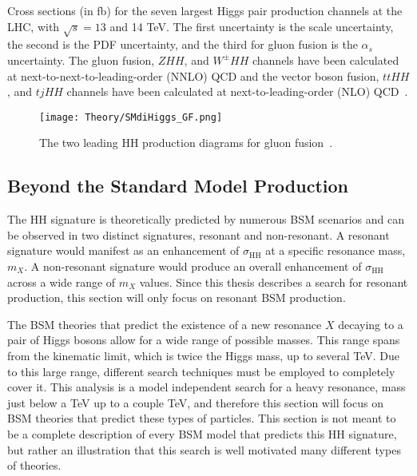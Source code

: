 \begin{table}[h!]
\begin{center}
    \caption{\label{tab:one} Cross sections (in fb) for the seven largest Higgs pair production channels at the LHC, with $\sqrt{s} = 13$ and 14 TeV. The first uncertainty is the scale uncertainty, the second is the PDF uncertainty, and the third for gluon fusion is the $\alpha_{s}$ uncertainty. The gluon fusion, $ZHH$, and $W^{\pm}HH$ channels have been calculated at next-to-next-to-leading-order (NNLO) QCD and the vector boson fusion, $ttHH$, and $tjHH$ channels have been calculated at next-to-leading-order (NLO) QCD~\cite{DiHiggsXsec}.}
\label{tab:DiHiggsXsec}
\end{center} 
\end{table}

\begin{figure}[h!]
\begin{center}
\texttt{[image: Theory/SMdiHiggs\_GF.png]}
\end{center}
\caption{The two leading HH production diagrams for gluon fusion~\cite{DiHiggsTheory}.}
\label{fig:GF_DiHiggs}
\end{figure}


\subsection{Beyond the Standard Model Production}

The HH signature is theoretically predicted by numerous BSM scenarios and can be observed in two distinct signatures, resonant and non-resonant. A resonant signature would manifest as an enhancement of $\sigma_{\mathrm{HH}}$ at a specific resonance mass, $m_{X}$. A non-resonant signature would produce an overall enhancement of $\sigma_{\mathrm{HH}}$ across a wide range of $m_{X}$ values. Since this thesis describes a search for resonant production, this section will only focus on resonant BSM production. 

The BSM theories that predict the existence of a new resonance $X$ decaying to a pair of Higgs bosons allow for a wide range of possible masses. This range spans from the kinematic limit, which is twice the Higgs mass, up to several TeV. Due to this large range, different search techniques must be employed to completely cover it. This analysis is a model independent search for a heavy resonance, mass just below a TeV up to a couple TeV, and therefore this section will focus on BSM theories that predict these types of particles. This section is not meant to be a complete description of every BSM model that predicts this HH signature, but rather an illustration that this search is well motivated many different types of theories. 

